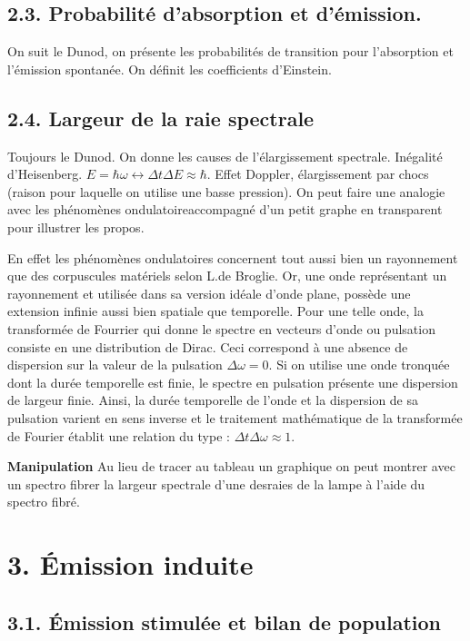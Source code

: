 \documentclass[french, a4paper, 10pt, twocolumn, landscape]{article}
\begin{document}
\subsection*{2.3. Probabilité d'absorption et d'émission.}

On suit le Dunod, on présente les probabilités de transition pour l'absorption et l'émission spontanée. On définit les coefficients d'Einstein.

\subsection*{2.4. Largeur de la raie spectrale}

Toujours le Dunod. On donne les causes de l'élargissement spectrale. Inégalité d'Heisenberg. $E=\hbar\omega\leftrightarrow \Delta t\Delta E\approx \hbar$. Effet Doppler, élargissement par chocs (raison pour laquelle on utilise une basse pression). On peut faire une analogie avec les phénomènes ondulatoireaccompagné d'un petit graphe en transparent pour illustrer les propos.\medskip

\textcolor{gray!40}{En effet les phénomènes ondulatoires concernent tout aussi bien un rayonnement que des corpuscules matériels selon L.de Broglie. Or, une onde représentant un rayonnement et utilisée dans sa version idéale d'onde plane, possède une extension infinie aussi bien spatiale que temporelle. Pour une telle onde, la transformée de Fourrier qui donne le spectre en vecteurs d'onde ou pulsation consiste en une distribution de Dirac. Ceci correspond à une absence de dispersion sur la valeur de la pulsation $\Delta \omega = 0$. Si on utilise une onde tronquée dont la durée temporelle  est finie, le spectre en pulsation présente une dispersion de largeur finie. Ainsi, la durée temporelle de l'onde et la dispersion de sa pulsation varient en sens inverse et le traitement mathématique de la transformée de Fourier établit une relation du type : $\Delta t\Delta\omega\approx 1$.}

\textbf{Manipulation} Au lieu de tracer au tableau un graphique on peut montrer avec un spectro fibrer la largeur spectrale d'une desraies de la lampe à l'aide du spectro fibré.

\section*{3. Émission induite}

\subsection*{3.1. Émission stimulée et bilan de population}
\end{document}
